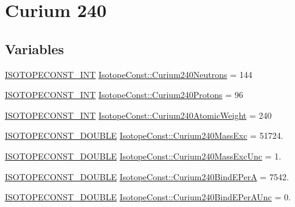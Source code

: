 \hypertarget{group___isotope_const-_curium-_cm240}{}\section{Curium 240}
\label{group___isotope_const-_curium-_cm240}
\subsection*{Variables}
\begin{DoxyCompactItemize}
\item 
\mbox{\hyperlink{group___isotope_const-_macros_ga5f18360b3e99483a35c32d789e62621c}{I\+S\+O\+T\+O\+P\+E\+C\+O\+N\+S\+T\+\_\+\+I\+NT}} \mbox{\hyperlink{group___isotope_const-_curium-_cm240_gab68e2bf644df87467f511934ffafdbd8}{Isotope\+Const\+::\+Curium240\+Neutrons}} = 144
\item 
\mbox{\hyperlink{group___isotope_const-_macros_ga5f18360b3e99483a35c32d789e62621c}{I\+S\+O\+T\+O\+P\+E\+C\+O\+N\+S\+T\+\_\+\+I\+NT}} \mbox{\hyperlink{group___isotope_const-_curium-_cm240_ga5d6c677206a46ca2f38fcfae030c9641}{Isotope\+Const\+::\+Curium240\+Protons}} = 96
\item 
\mbox{\hyperlink{group___isotope_const-_macros_ga5f18360b3e99483a35c32d789e62621c}{I\+S\+O\+T\+O\+P\+E\+C\+O\+N\+S\+T\+\_\+\+I\+NT}} \mbox{\hyperlink{group___isotope_const-_curium-_cm240_ga646ca958e14ba3f5cb82f4f904622c97}{Isotope\+Const\+::\+Curium240\+Atomic\+Weight}} = 240
\item 
\mbox{\hyperlink{group___isotope_const-_macros_ga8f45a7272ce02c0b4c65c44636ed719a}{I\+S\+O\+T\+O\+P\+E\+C\+O\+N\+S\+T\+\_\+\+D\+O\+U\+B\+LE}} \mbox{\hyperlink{group___isotope_const-_curium-_cm240_gac53f3a8880b09e216027a94bba12d414}{Isotope\+Const\+::\+Curium240\+Mass\+Exc}} = 51724.
\item 
\mbox{\hyperlink{group___isotope_const-_macros_ga8f45a7272ce02c0b4c65c44636ed719a}{I\+S\+O\+T\+O\+P\+E\+C\+O\+N\+S\+T\+\_\+\+D\+O\+U\+B\+LE}} \mbox{\hyperlink{group___isotope_const-_curium-_cm240_gad077a58527dbd455752966efccd63683}{Isotope\+Const\+::\+Curium240\+Mass\+Exc\+Unc}} = 1.
\item 
\mbox{\hyperlink{group___isotope_const-_macros_ga8f45a7272ce02c0b4c65c44636ed719a}{I\+S\+O\+T\+O\+P\+E\+C\+O\+N\+S\+T\+\_\+\+D\+O\+U\+B\+LE}} \mbox{\hyperlink{group___isotope_const-_curium-_cm240_ga2ddcb105a1093c30923bfaf07a877fc4}{Isotope\+Const\+::\+Curium240\+Bind\+E\+PerA}} = 7542.
\item 
\mbox{\hyperlink{group___isotope_const-_macros_ga8f45a7272ce02c0b4c65c44636ed719a}{I\+S\+O\+T\+O\+P\+E\+C\+O\+N\+S\+T\+\_\+\+D\+O\+U\+B\+LE}} \mbox{\hyperlink{group___isotope_const-_curium-_cm240_ga75439918a8d5528f85c90acebc9ed105}{Isotope\+Const\+::\+Curium240\+Bind\+E\+Per\+A\+Unc}} = 0.

\end{DoxyCompactItemize}
